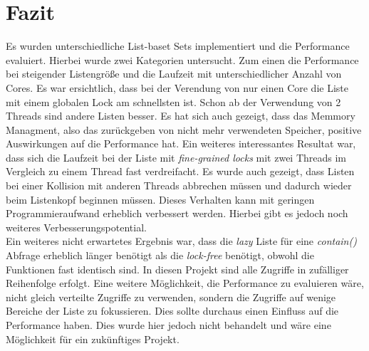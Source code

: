\section{Fazit}
Es wurden unterschiedliche List-baset Sets implementiert und die Performance evaluiert.
Hierbei wurde zwei Kategorien untersucht. Zum einen die Performance bei steigender Listengröße und
die Laufzeit mit unterschiedlicher Anzahl von Cores. 
Es war ersichtlich, dass bei der Verendung von nur einen Core die Liste mit 
einem globalen Lock am schnellsten ist. Schon ab der Verwendung von 2 Threads sind
andere Listen besser. Es hat sich auch gezeigt, dass das Memmory Managment, also das zurückgeben
von nicht mehr verwendeten Speicher, positive Auswirkungen auf die Performance hat. Ein weiteres
interessantes Resultat war, dass sich die Laufzeit bei der Liste mit \textit{fine-grained locks} mit zwei Threads 
im Vergleich zu einem Thread fast verdreifacht. Es wurde auch gezeigt, dass Listen bei einer Kollision
mit anderen Threads abbrechen müssen und dadurch wieder beim Listenkopf beginnen müssen. 
Dieses Verhalten kann mit geringen Programmieraufwand erheblich verbessert werden. Hierbei 
gibt es jedoch noch weiteres Verbesserungspotential. \\
Ein weiteres nicht erwartetes Ergebnis war, dass die \textit{lazy} Liste für eine \textit{contain()} Abfrage
erheblich länger benötigt als die \textit{lock-free} benötigt, obwohl die Funktionen fast identisch sind. 
In diesen Projekt sind alle Zugriffe in zufälliger Reihenfolge erfolgt. Eine weitere Möglichkeit, die Performance
zu evaluieren wäre, nicht gleich verteilte Zugriffe zu verwenden, sondern die Zugriffe auf wenige Bereiche der Liste zu fokussieren. 
Dies sollte durchaus einen Einfluss auf die Performance haben.
Dies wurde hier jedoch nicht behandelt und wäre eine Möglichkeit für ein zukünftiges Projekt.